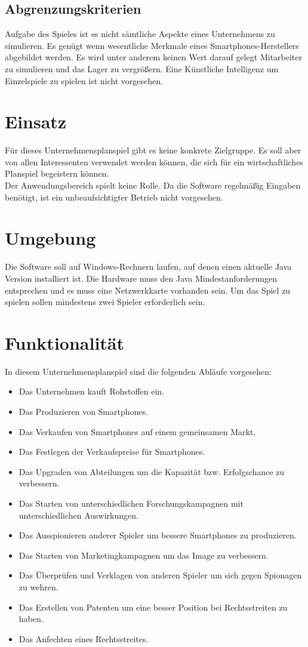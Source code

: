 \subsection{Abgrenzungskriterien}
Aufgabe des Spieles ist es nicht sämtliche Aspekte eines Unternehmens zu simulieren. Es genügt wenn wesentliche Merkmale eines Smartphones-Herstellers abgebildet werden. Es wird unter anderem keinen Wert darauf gelegt Mitarbeiter zu simulieren und das Lager zu vergrößern. Eine Künstliche Intelligenz um Einzelspiele zu spielen ist nicht vorgesehen.

\section{Einsatz}
Für dieses Unternehmensplanspiel gibt es keine konkrete Zielgruppe. Es soll aber von allen Interessenten verwendet werden können, die sich für ein wirtschaftliches Planspiel begeistern können.\\
Der Anwendungsbereich spielt keine Rolle. Da die Software regelmäßig Eingaben benötigt, ist ein unbeaufsichtigter Betrieb nicht vorgesehen.

\section{Umgebung}
Die Software soll auf Windows-Rechnern laufen, auf denen einen aktuelle Java Version installiert ist. Die Hardware muss den Java Mindestanforderungen entsprechen und es muss eine Netzwerkkarte vorhanden sein. Um das Spiel zu spielen sollen mindestens zwei Spieler erforderlich sein.

\section{Funktionalität}
In diesem Unternehmensplanspiel sind die folgenden Abläufe vorgesehen:
\begin{itemize}
\item Das Unternehmen kauft Rohstoffen ein.
\item Das Produzieren von Smartphones.
\item Das Verkaufen von Smartphones auf einem gemeinsamen Markt.
\item Das Festlegen der Verkaufspreise für Smartphones.
\item Das Upgraden von Abteilungen um die Kapazität bzw. Erfolgschance zu verbessern.
\item Das Starten von unterschiedlichen Forschungskampagnen mit unterschiedlichen Auswirkungen.
\item Das Ausspionieren anderer Spieler um bessere Smartphones zu produzieren.
\item Das Starten von Marketingkampagnen um das Image zu verbessern.
\item Das Überprüfen und Verklagen von anderen Spieler um sich gegen Spionagen zu wehren.
\item Das Erstellen von Patenten um eine besser Position bei Rechtsstreiten zu haben.
\item Das Anfechten eines Rechtsstreites.
\end{itemize}

